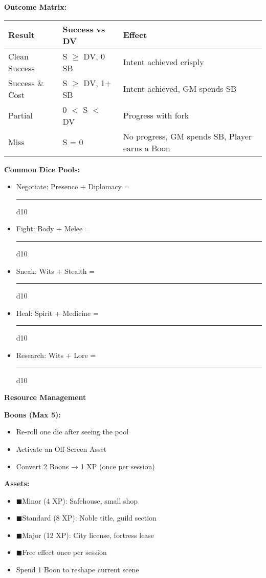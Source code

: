 \documentclass[10pt]{article}
\newcommand{\boon}{\textcolor{orange}{\ding{72}}}
\newcommand{\asset}{\textcolor{green!60!black}{$\blacksquare$}}
\begin{document}
\begin{mdframed}[backgroundcolor=background, linewidth=0pt]
\begin{adjustwidth}{0.2cm}{0.2cm}
\textbf{Outcome Matrix:}
\begin{center}
\begin{tabular}{|l|l|l|}
\hline
\cellcolor{lightaccent} \textbf{Result} & \cellcolor{lightaccent} \textbf{Success vs DV} & \cellcolor{lightaccent} \textbf{Effect} \\
\hline
Clean Success & S $\geq$ DV, 0 SB & Intent achieved crisply \\
Success \& Cost & S $\geq$ DV, 1+ SB & Intent achieved, GM spends SB \\
Partial & 0 $<$ S $<$ DV & Progress with fork \\
Miss & S = 0 & No progress, GM spends SB, Player earns a Boon \\
\hline
\end{tabular}
\end{center}

\textbf{Common Dice Pools:}
\begin{itemize}[leftmargin=*]
\item Negotiate: Presence + Diplomacy = \rule{2cm}{0.4pt} d10
\item Fight: Body + Melee = \rule{2cm}{0.4pt} d10
\item Sneak: Wits + Stealth = \rule{2cm}{0.4pt} d10
\item Heal: Spirit + Medicine = \rule{2cm}{0.4pt} d10
\item Research: Wits + Lore = \rule{2cm}{0.4pt} d10
\end{itemize}
\end{adjustwidth}

\vspace{0.3cm}

\begin{mdframed}[backgroundcolor=sectionbg, linewidth=1pt, linecolor=accentcolor]
\textbf{\large Resource Management}
\end{mdframed}

\begin{adjustwidth}{0.2cm}{0.2cm}
\vspace{0.2cm}
\textbf{Boons (Max 5):}
\begin{itemize}[leftmargin=*]
\item \boon Re-roll one die after seeing the pool
\item \boon Activate an Off-Screen Asset
\item \boon Convert 2 Boons → 1 XP (once per session)
\end{itemize}

\textbf{Assets:}
\begin{itemize}[leftmargin=*]
\item \asset Minor (4 XP): Safehouse, small shop
\item \asset Standard (8 XP): Noble title, guild section
\item \asset Major (12 XP): City license, fortress lease
\item \asset Free effect once per session
\item Spend 1 Boon to reshape current scene
\end{itemize}


\end{adjustwidth}
\end{mdframed}
\end{document}

